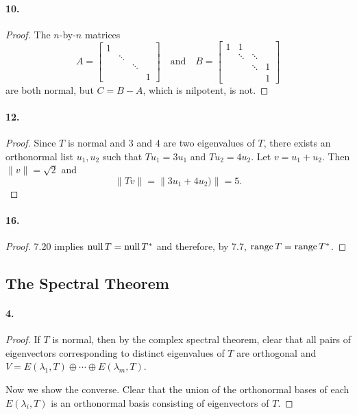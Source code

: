   \paragraph{10.}
  \begin{proof}
    The $n$-by-$n$ matrices
    \[
      A=
      \begin{bmatrix}
        1 &        &        & \\
          & \ddots &        & \\
          &        & \ddots & \\
          &        &        & 1
      \end{bmatrix}
      \quad\text{and}\quad
      B=
      \begin{bmatrix}
        1 & 1      &        &   \\
          & \ddots & \ddots &   \\
          &        & \ddots & 1 \\
          &        &        & 1
      \end{bmatrix}
    \]
    are both normal, but $C=B-A$, which is nilpotent, is not.
  \end{proof}

  \paragraph{12.}
  \begin{proof}
    Since $T$ is normal and $3$ and $4$ are two eigenvalues of $T$, there exists
    an orthonormal list $u_1,u_2$ such that $Tu_1=3u_1$ and $Tu_2=4u_2$. Let $v
    =u_1+u_2$. Then $\|v\|=\sqrt{2}$ and
    \[
      \|Tv\| = \|3u_1+4u_2)\| = 5.
    \]
  \end{proof}

  \paragraph{16.}
  \begin{proof}
    7.20 implies $\operatorname{null} T=\operatorname{null} T^*$ and therefore, by 7.7, $\operatorname{range} T=\operatorname{range} T^*$.
  \end{proof}

\subsection{The Spectral Theorem}
  \paragraph{4.}
  \begin{proof}
    If $T$ is normal, then by the complex spectral theorem, clear that all pairs
    of eigenvectors corresponding to distinct eigenvalues of $T$ are orthogonal
    and $V=E(\lambda_1,T)\oplus\cdots\oplus E(\lambda_m,T)$.\par
    Now we show the converse. Clear that the union of the orthonormal bases of
    each $E(\lambda_i,T)$ is an orthonormal basis consisting of eigenvectors of
    $T$.
  \end{proof}

